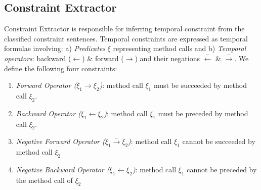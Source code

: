 \subsection{Constraint Extractor}
\label{sub:ConsExtract}

Constraint Extractor is responsible for inferring temporal constraint from the classified constraint sentences.
Temporal constraints are expressed as temporal formulae involving: 
a) \textit{Predicates} $\xi$ representing method calls and 
b) \textit{Temporal operators}: backward ($\leftarrow$) \& forward ($\rightarrow$) and their negations $\xleftarrow{-}$ \& $\xrightarrow{-}$.
We define the following four constraints:

%
%
%

\begin{enumerate}
\item \textit{Forward Operator ($\xi_1 \rightarrow \xi_2$)}: method call $\xi_1$ must be succeeded by method call $\xi_2$. 

\item \textit{Backward Operator ($\xi_1 \leftarrow \xi_2$)}: method call $\xi_1$ must be preceded by method call $\xi_2$.

\item \textit{Negative Forward Operator ($\xi_1 \xrightarrow{-} \xi_2$)}: method call $\xi_1$ cannot be succeeded by method call $\xi_2$

\item \textit{Negative Backward Operator ($\xi_1 \xleftarrow{-} \xi_2$)}: method call $\xi_1$ cannot be preceded by the method call of $\xi_2$
\end{enumerate}

